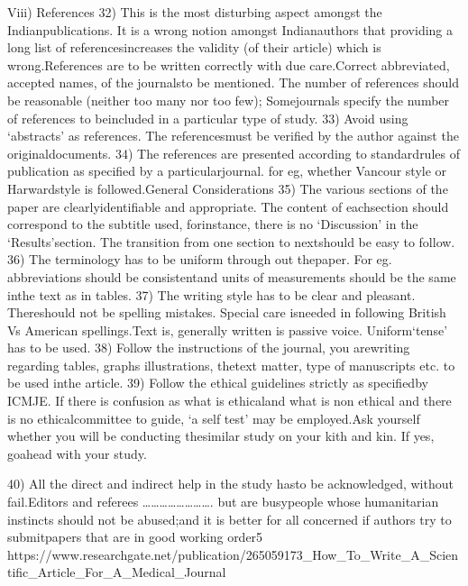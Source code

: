 \documentclass{article}
\begin{document}
	Viii) References
	32) This is the most disturbing aspect amongst the Indianpublications. It is a wrong notion amongst Indianauthors that providing a long list of referencesincreases the validity (of their article) which is wrong.References are to be written correctly with due care.Correct abbreviated, accepted names, of the journalsto be mentioned. The number of references should
	be reasonable (neither too many nor too few); Somejournals specify the number of references to beincluded in a particular type of study.
	33) Avoid using ‘abstracts’ as references.  The referencesmust be verified by the author against the originaldocuments.
	34) The references are presented according to standardrules of publication as specified by a particularjournal. for eg, whether Vancour style or Harwardstyle is followed.General  Considerations
	35) The various sections of the paper are clearlyidentifiable and appropriate. The content of eachsection should correspond to the subtitle used, forinstance, there is no ‘Discussion’ in the ‘Results’section. The transition from one section to nextshould be easy to follow.
	36) The terminology has to be uniform through out thepaper. For eg.  abbreviations  should be consistentand units of measurements should be the same inthe text as in tables.
	37) The writing style has to be clear and pleasant.  Thereshould not be spelling mistakes. Special care isneeded in following British Vs American spellings.Text is, generally written is passive voice.  Uniform‘tense’ has to be used.
	38) Follow the instructions of the journal, you arewriting regarding tables, graphs illustrations, thetext matter, type of  manuscripts etc. to be used inthe article.
	39) Follow the ethical guidelines strictly as specifiedby ICMJE. If there is confusion as what is ethicaland what is non ethical and there is no ethicalcommittee to guide, ‘a self test’ may be employed.Ask yourself whether you will be conducting thesimilar study  on your kith and kin. If yes, goahead with your study.
	
	40)  All the direct and  indirect help in the study hasto be acknowledged, without fail.Editors and referees ……………………. but are busypeople whose humanitarian instincts should not be abused;and it is better for all concerned if authors try to submitpapers that are in good working order5 
	https://www.researchgate.net/publication/265059173_How_To_Write_A_Scientific_Article_For_A_Medical_Journal
\end{document}
